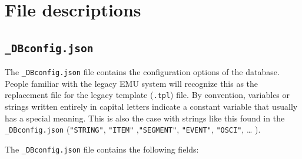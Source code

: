 \documentclass[]{book}
\theoremstyle{definition}
\theoremstyle{definition}
\theoremstyle{definition}
\theoremstyle{remark}
\begin{document}
\hypertarget{file-descriptions}{%
\section{File descriptions}\label{file-descriptions}}

\hypertarget{subsec:app-chapFileFormatsDBconfig}{%
\subsection{\texorpdfstring{\texttt{\_DBconfig.json}}{\_DBconfig.json}}\label{subsec:app-chapFileFormatsDBconfig}}

The \texttt{\_DBconfig.json} file contains the configuration options of
the database. People familiar with the legacy EMU system will recognize
this as the replacement file for the legacy template (\texttt{.tpl})
file. By convention, variables or strings written entirely in capital
letters indicate a constant variable that usually has a special meaning.
This is also the case with strings like this found in the
\texttt{\_DBconfig.json} (\texttt{"STRING"}, \texttt{"ITEM"}
,\texttt{"SEGMENT"}, \texttt{"EVENT"}, \texttt{"OSCI"}, \ldots{} ).

The \texttt{\_DBconfig.json} file contains the following fields:
\end{document}
